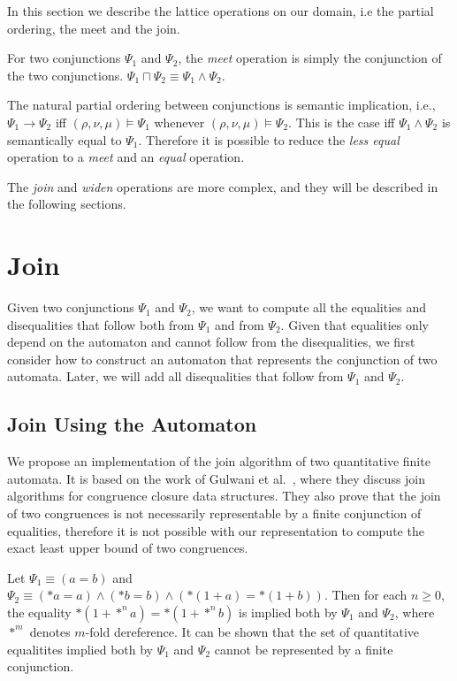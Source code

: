 


In this section we describe the lattice operations on our domain, i.e the partial ordering, the meet and the join.

For two conjunctions $\Psi_1$ and $\Psi_2$, the \emph{meet} operation is simply the conjunction of the two conjunctions. $\Psi_1 \sqcap \Psi_2 \equiv \Psi_1 \land \Psi_2$.

The natural partial ordering between conjunctions is semantic implication, i.e.,
$\Psi_1 \rightarrow \Psi_2$
iff $(\rho, \nu, \mu) \models \Psi_1$ whenever $(\rho, \nu, \mu) \models \Psi_2$.
This is the case iff $\Psi_1 \land \Psi_2$ is semantically equal to $\Psi_1$. Therefore it is possible to reduce the \emph{less equal} operation to a \emph{meet} and an \emph{equal} operation.

The \emph{join} and \emph{widen} operations are more complex, and they will be described in the following sections.

\section{Join}

Given two conjunctions $\Psi_1$ and $\Psi_2$, we want to compute all the equalities and disequalities that follow both from $\Psi_1$ and from $\Psi_2$.
Given that equalities only depend on the automaton and cannot follow from the disequalities, we first consider how to construct an automaton that represents the conjunction of two automata.
Later, we will add all disequalities that follow from $\Psi_1$ and $\Psi_2$.

\subsection{Join Using the Automaton}

We propose an implementation of the join algorithm of two quantitative finite automata.
It is based on the work of Gulwani et al.~\cite{join}, where they discuss join algorithms for congruence closure data structures.
They also prove that the join of two congruences is not necessarily representable by a finite conjunction of equalities, therefore it is not possible with our representation to compute the exact least upper bound of two congruences.

\begin{example}\label{example:infinite-join}
    Let $\Psi_1 \equiv (a = b)$ and $\Psi_2 \equiv (*a = a)\land (*b=b) \land (*(1 + a) = *(1 + b))$. Then for each $n \geq 0$, the equality $*(1+*^n a) = *(1 + *^n b)$ is implied both by $\Psi_1$ and $\Psi_2$, where $*^m$ denotes $m$-fold dereference.
    It can be shown that the set of quantitative equalitites implied both by $\Psi_1$ and $\Psi_2$ cannot be represented by a finite conjunction\cite{join, 2pointer}.
\end{example}

